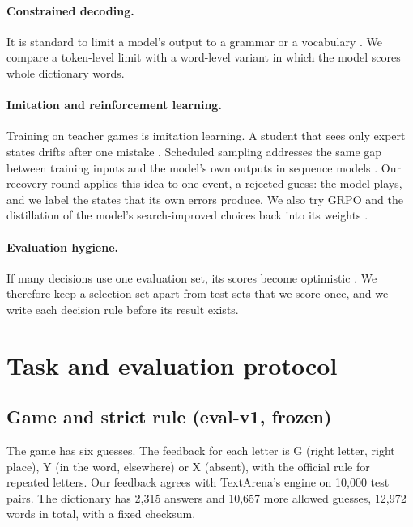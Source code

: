 \documentclass{article}
\begin{document}
\paragraph{Constrained decoding.} It is standard to limit a model's output to a grammar or a vocabulary \citep{scholak2021picard,willard2023outlines,geng2023grammar}. We compare a token-level limit with a word-level variant in which the model scores whole dictionary words.

\paragraph{Imitation and reinforcement learning.} Training on teacher games is imitation learning. A student that sees only expert states drifts after one mistake \citep{ross2011dagger}. Scheduled sampling addresses the same gap between training inputs and the model's own outputs in sequence models \citep{bengio2015scheduled}. Our recovery round applies this idea to one event, a rejected guess: the model plays, and we label the states that its own errors produce. We also try GRPO \citep{shao2024deepseekmath} and the distillation of the model's search-improved choices back into its weights \citep{anthony2017exit,hinton2015distilling}.

\paragraph{Evaluation hygiene.} If many decisions use one evaluation set, its scores become optimistic \citep{dwork2015holdout,recht2019imagenet}. We therefore keep a selection set apart from test sets that we score once, and we write each decision rule before its result exists.

\section{Task and evaluation protocol}
\label{sec:protocol}

\subsection{Game and strict rule (eval-v1, frozen)}
The game has six guesses.
The feedback for each letter is G (right letter, right place), Y (in the word, elsewhere) or X (absent), with the official rule for repeated letters.
Our feedback agrees with TextArena's engine on 10,000 test pairs.
The dictionary has 2,315 answers and 10,657 more allowed guesses, 12,972 words in total, with a fixed checksum.
\end{document}
